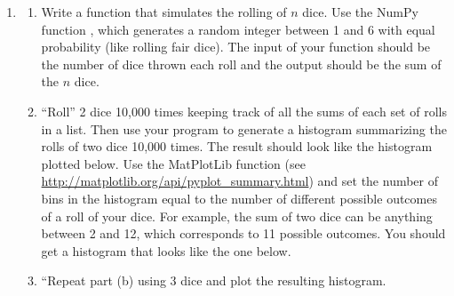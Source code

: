 \documentclass[letterpaper,10pt,english]{sphinxmanual}
\begin{document}
\begin{enumerate}
\item {} \begin{enumerate}
\item {} 
Write a function that simulates the rolling of $n$ dice.  Use the NumPy function , which generates a random integer between 1 and 6 with equal probability (like rolling fair dice).  The input of your function should be the number of dice thrown each roll and the output should be the sum of the $n$ dice.

\item {} 
``Roll'' 2 dice 10,000 times keeping track of all the sums of each set of rolls in a list.  Then use your program to generate a histogram  summarizing the rolls of two dice 10,000 times.  The result should look like the histogram plotted below.  Use the MatPlotLib function  (see \href{http://matplotlib.org/api/pyplot\_summary.html}{http://matplotlib.org/api/pyplot\_summary.html}) and set the number of bins in the histogram equal to the number of different possible outcomes of a roll of your dice.  For example, the sum of two dice can be anything between 2 and 12, which corresponds to 11 possible outcomes.  You should get a histogram that looks like the one below.

\item {} 
``Repeat part (b) using 3 dice and plot the resulting histogram.

\end{enumerate}
\begin{figure}[htbp]
\centering

\label{chap7/chap7_funcs:fig-dicerolln}\end{figure}


\end{enumerate}
\end{document}
